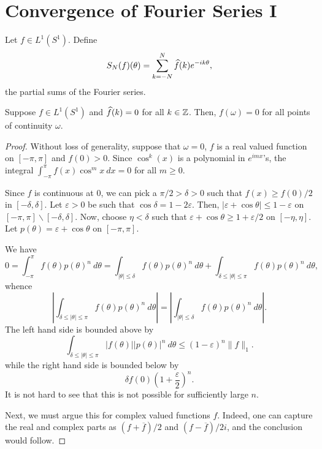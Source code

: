 \section{Convergence of Fourier Series I}

Let $f\in L^1(S^1)$. Define 
\begin{equation*}
    S_N(f)(\theta) = \sum_{k = -N}^N\widehat{f}(k)e^{-ik\theta},
\end{equation*}
the partial sums of the Fourier series.

\begin{theorem}
    Suppose $f\in L^1(S^1)$ and $\widehat{f}(k) = 0$ for all $k\in\mathbb{Z}$. Then, $f(\omega) = 0$ for all points of continuity $\omega$.
\end{theorem}
\begin{proof}
    Without loss of generality, suppose that $\omega = 0$, $f$ is a real valued function on $[-\pi,\pi]$ and $f(0) > 0$. Since $\cos^k(x)$ is a polynomial in $e^{imx}$'s, the integral $\int_{-\pi}^\pi f(x)\cos^mx~dx = 0$ for all $m\ge 0$.

    Since $f$ is continuous at $0$, we can pick a $\pi/2 > \delta > 0$ such that $f(x)\ge f(0)/2$ in $[-\delta, \delta]$. Let $\varepsilon > 0$ be such that $\cos\delta = 1 - 2\varepsilon$. Then, $|\varepsilon + \cos\theta|\le 1 - \varepsilon$ on $[-\pi, \pi]\backslash[-\delta,\delta]$. Now, choose $\eta < \delta$ such that $\varepsilon + \cos\theta\ge 1 + \varepsilon/2$ on $[-\eta,\eta]$. Let $p(\theta) = \varepsilon + \cos\theta$ on $[-\pi, \pi]$. 

    We have 
    \begin{equation*}
        0 = \int_{-\pi}^\pi f(\theta) p(\theta)^n~d\theta = \int_{|\theta|\le\delta} f(\theta)p(\theta)^n~d\theta + \int_{\delta\le|\theta|\le\pi}f(\theta)p(\theta)^n~d\theta,
    \end{equation*}
    whence 
    \begin{equation*}
        \left|\int_{\delta\le |\theta|\le\pi}f(\theta)p(\theta)^n~d\theta\right| = \left|\int_{|\theta|\le\delta}f(\theta)p(\theta)^n~d\theta\right|.
    \end{equation*}
    The left hand side is bounded above by 
    \begin{equation*}
        \int_{\delta\le|\theta|\le\pi}|f(\theta)||p(\theta)|^n~d\theta\le (1 - \varepsilon)^n\|f\|_1.
    \end{equation*}
    while the right hand side is bounded below by 
    \begin{equation*}
        \delta f(0)\left(1 + \frac{\varepsilon}{2}\right)^n.
    \end{equation*}
    It is not hard to see that this is not possible for sufficiently large $n$.

    Next, we must argue this for complex valued functions $f$. Indeed, one can capture the real and complex parts as $(f + \overline f)/2$ and $(f - \overline f)/2i$, and the conclusion would follow.
\end{proof}

